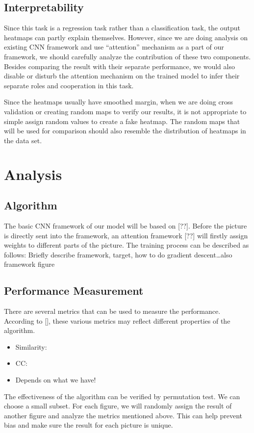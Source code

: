 \documentclass[12pt]{article}
\begin{document}
\subsection{Interpretability}
Since this task is a regression task rather than a classification task, the output heatmaps can partly explain themselves. 
However, since we are doing analysis on existing CNN framework and use “attention” mechanism as a part of our framework, we should carefully analyze the contribution of these two components. 
Besides comparing the result with their separate performance, we would also disable or disturb the attention mechanism on the trained model to infer their separate roles and cooperation in this task.

Since the heatmaps usually have smoothed margin, when we are doing cross validation or creating random maps to verify our results, it is not appropriate to simple assign random values to create a fake heatmap. 
The random maps that will be used for comparison should also resemble the distribution of heatmaps in the data set.

\section{Analysis}
\subsection{Algorithm}
The basic CNN framework of our model will be based on [??]. Before the picture is directly sent into the framework, an attention framework [??] will firstly assign weights to different parts of the picture. 
The training process can be described as follows:
Briefly describe framework, target, how to do gradient descent…also framework figure

\subsection{Performance Measurement}
There are several metrics that can be used to measure the performance. According to [], these various metrics may reflect different properties of the algorithm.
\begin{itemize}
    \item Similarity:
    \item CC:
    \item Depends on what we have!
\end{itemize}
The effectiveness of the algorithm can be verified by permutation test. We can choose a small subset. 
For each figure, we will randomly assign the result of another figure and analyze the metrics mentioned above. This can help prevent bias and make sure the result for each picture is unique.
\end{document}
